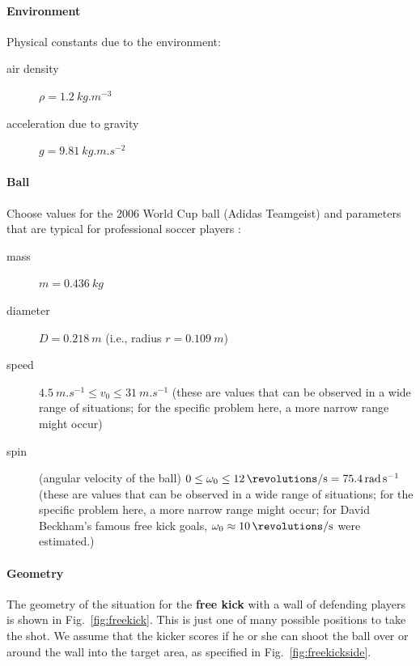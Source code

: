 \documentclass[letterpaper]{scrartcl}
\begin{document}
\paragraph{Environment}

Physical constants due to the environment:
\begin{description}
\item[air density] $\rho = \SI{1.2}{kg.m^{-3}}$
\item[acceleration due to gravity] $g = \SI{9.81}{kg.m.s^{-2}}$
\end{description}

\paragraph{Ball}

Choose values for the 2006 World Cup ball (Adidas Teamgeist)
\citep{Goff:2010aa} and parameters that are typical for professional
soccer players \citep{Goff:2009aa}:
\begin{description}
\item[mass] $m = \SI{0.436}{kg}$
\item[diameter] $D = \SI{0.218}{m}$ (i.e., radius $r = \SI{0.109}{m}$)
\item[speed]
  $\SI{4.5}{m.s^{-1}} \le v_{0} \le \SI{31}{m.s^{-1}}$ (these are
  values that can be observed in a wide range of situations; for the
  specific problem here, a more narrow range might occur)
\item[spin] (angular velocity of the ball)
  $0 \le \omega_{0} \le \SI{12}{\revolutions\per\second} =
  \SI{75.4}{rad.s^{-1}}$ (these are values that can be observed in a
  wide range of situations; for the specific problem here, a more
  narrow range might occur; for David Beckham's famous free kick
  goals, $\omega_{0} \approx \SI{10}{\revolutions\per\second}$ were
  estimated.)
\end{description}


\paragraph{Geometry}

The geometry of the situation for the \textbf{free kick} with a wall
of defending players is shown in Fig.~\ref{fig:freekick}. This is just
one of many possible positions to take the shot. We assume that the
kicker scores if he or she can shoot the ball over or around the wall
into the target area, as specified in Fig.~\ref{fig:freekickside}. 
\end{document}
